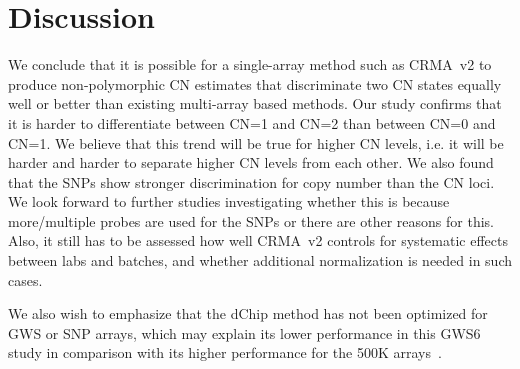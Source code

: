 \documentclass{bioinfo}
\newcommand{\GWS}{GWS\xspace}
\newcommand{\GWSSix}{GWS6\xspace}
\begin{document}
\section{Discussion}
\label{secDiscussion}
We conclude that it is possible for a single-array method such as CRMA~v2 to produce non-polymorphic CN estimates that discriminate two CN states equally well or better than existing multi-array based methods.
Our study confirms that it is harder to differentiate between CN=1 and CN=2 than between CN=0 and CN=1.  We believe that this trend will be true for higher CN levels, i.e. it will be harder and harder to separate higher CN levels from each other.
We also found that the SNPs show stronger discrimination for copy number than the CN loci.
We look forward to further studies investigating whether this is because more/multiple probes are used for the SNPs or there are other reasons for this.
Also, it still has to be assessed how well CRMA~v2 controls for systematic effects between labs and batches, and whether additional normalization is needed in such cases.

We also wish to emphasize that the dChip method has not been optimized for \GWS or SNP arrays, which may explain its lower performance in this \GWSSix study in comparison with its higher performance for the 500K arrays~\citep{BengtssonH_etal_2008a}.


\end{document}
